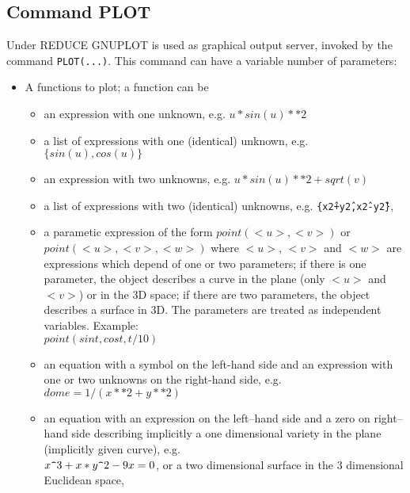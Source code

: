 \subsection{Command PLOT}

Under {\small REDUCE} GNUPLOT is used as graphical output
server, invoked by the command \verb+PLOT(...)+.
This command can have a variable number of
parameters:

\begin{itemize}
\item A functions to plot; a function can be
  \begin{itemize}
    \item an expression with one unknown, e.g. $u*sin(u)**2$

    \item a list of expressions with one (identical) unknown, 
          e.g. $\{sin(u),cos(u)\}$

    \item an expression with two unknowns, e.g. 
          $u*sin(u)**2+sqrt(v)$

    \item a list of expressions with two (identical) unknowns,
      e.g.  \texttt{\{x\^{2}+y\^{2},\allowbreak x\^{2}-y\^{2}\}},

    \item a parametic expression  of the form $point(<u>,<v>)$ or
          $point(<u>,<v>,<w>)$ where $<u>$, $<v>$ and $<w>$ are
          expressions which depend of one or two parameters;
          if there is one parameter, the object describes a curve
          in the plane (only $<u>$ and $<v>$) or in the 3D space;
          if there are two parameters, the object describes a
          surface in 3D. The parameters are treated as independent
          variables. Example:\\
                $ point(sin t,cos t,t/10)$

    \item an equation with a symbol on the left-hand side
         and an expression with one or two unknowns on the
         right-hand side, e.g.\\ $dome=1/(x**2+y**2)$

    \item an equation with an expression on the 
         left--hand side and a zero on right--hand side
         describing implicitly a one dimensional 
         variety in the plane (implicitly given curve), e.g.
            \\ $x{\verb+^+}3 + x*y{\verb+^+}2 -9x = 0$, or a two dimensional
         surface in the 3 dimensional Euclidean space,


\end{itemize}
\end{itemize}
